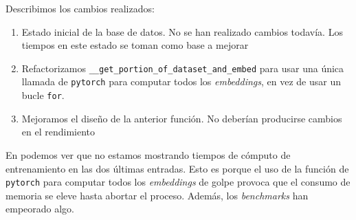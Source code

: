 \begin{table}[H]
    \centering
    \caption{Tabla que recoge el segundo proceso de optimización del código. Identificamos numéricamente los cambios realizados, que a continuación describiremos. Por cada cambio, vemos los nuevos resultados en los \textit{benchmarks}. También vemos el tiempo que tarda en completarse el ciclo de entrenamiento. Los tiempos de los \textit{benchmarks} se dan como un par (media, desviación típica)}
    \label{table:optimization_process_second}
\end{table}

Describimos los cambios realizados:

\begin{enumerate}
    \item Estado inicial de la base de datos. No se han realizado cambios todavía. Los tiempos en este estado se toman como base a mejorar
    \item Refactorizamos \lstinline{__get_portion_of_dataset_and_embed} para usar una única llamada de \lstinline{pytorch} para computar todos los \textit{embeddings}, en vez de usar un bucle \lstinline{for}.
    \item Mejoramos el diseño de la anterior función. No deberían producirse cambios en el rendimiento
\end{enumerate}

En  podemos ver que no estamos mostrando tiempos de cómputo de entrenamiento en las dos últimas entradas. Esto es porque el uso de la función de \lstinline{pytorch} para computar todos los \textit{embeddings} de golpe provoca que el consumo de memoria se eleve hasta abortar el proceso. Además, los \textit{benchmarks} han empeorado algo.

